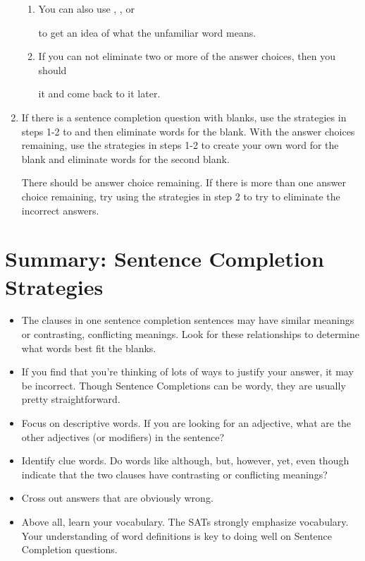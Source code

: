 \begin{enumerate}
\begin{enumerate}[label=(\Alph*)]
\item You can also use \longline, \longline, or

\longline to get an idea of what the unfamiliar word means.

\item If you can not eliminate two or more of the answer choices, then you should

\longline it and come back to it later.
\end{enumerate}

\item{If there is a sentence completion question with \longline blanks, use the strategies in steps 1-2 to \longline and then eliminate words for the \longline blank. With the answer choices remaining, use the strategies in steps 1-2 to create your own word for the blank and  \longline eliminate words for the second blank.}

\bigskip
There should be \longline answer choice remaining. If there is more than one answer choice remaining, try using the strategies in step 2 to try to eliminate the incorrect answers. 
\end{enumerate}
\pagebreak

\section[Strategies]{Summary: Sentence Completion Strategies}

\begin{itemize}
\item The clauses in one sentence completion sentences may have similar meanings or contrasting, conflicting meanings.  Look for these relationships to determine what words best fit the blanks.
\vfill\item If you find that you're thinking of lots of ways to justify your answer, it may be incorrect.  Though Sentence Completions can be wordy, they are usually pretty straightforward.
\vfill\item Focus on descriptive words.  If you are looking for an adjective, what are the other adjectives (or modifiers) in the sentence?
\vfill\item Identify clue words.  Do words like although, but, however, yet, even though indicate that the two clauses have contrasting or conflicting meanings?
\vfill\item Cross out answers that are obviously wrong.
\vfill\item Above all, learn your vocabulary.  The SATs strongly emphasize vocabulary.  Your understanding of word definitions is key to doing well on Sentence Completion questions.
\end{itemize}

